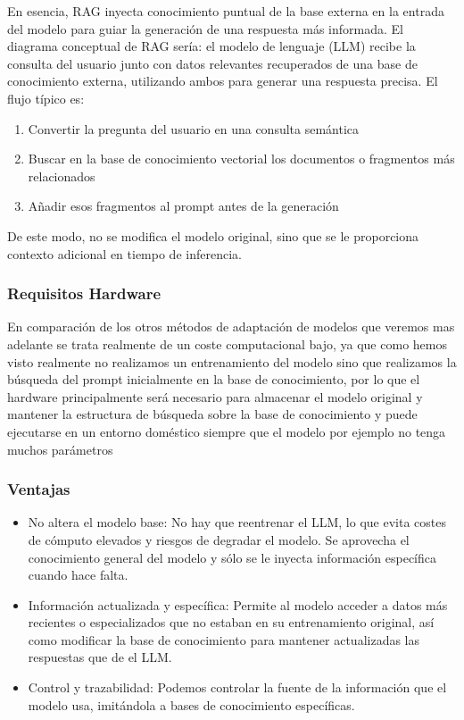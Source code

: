 En esencia, RAG inyecta conocimiento puntual de la base externa en la entrada del modelo para guiar la generación de una respuesta más informada. El diagrama conceptual de RAG sería: el modelo de lenguaje (LLM) recibe la consulta del usuario junto con datos relevantes recuperados de una base de conocimiento externa, utilizando ambos para generar una respuesta precisa. El flujo típico es:

\begin{enumerate}
    \item Convertir la pregunta del usuario en una consulta semántica
    \item Buscar en la base de conocimiento vectorial los documentos o fragmentos más relacionados
    \item Añadir esos fragmentos al prompt antes de la generación
\end{enumerate}

De este modo, no se modifica el modelo original, sino que se le proporciona contexto adicional en tiempo de inferencia.

\subsubsection{Requisitos Hardware}
En comparación de los otros métodos de adaptación de modelos que veremos mas adelante se trata realmente de un coste computacional bajo, ya que como hemos visto realmente no realizamos un entrenamiento del modelo sino que realizamos la búsqueda del prompt inicialmente en la base de conocimiento, por lo que el hardware principalmente será necesario para almacenar el modelo original y mantener la estructura de búsqueda sobre la base de conocimiento y puede ejecutarse en un entorno doméstico siempre que el modelo por ejemplo no tenga muchos parámetros 

\subsubsection{Ventajas}

\begin{itemize}
    \item No altera el modelo base: No hay que reentrenar el LLM, lo que evita costes de cómputo elevados y riesgos de degradar el modelo. Se aprovecha el conocimiento general del modelo y sólo se le inyecta información específica cuando hace falta.

    \item Información actualizada y específica: Permite al modelo acceder a datos más recientes o especializados que no estaban en su entrenamiento original, así como modificar la base de conocimiento para mantener actualizadas las respuestas que de el LLM.

    \item Control y trazabilidad: Podemos controlar la fuente de la información que el modelo usa, imitándola a bases de conocimiento específicas.
\end{itemize}

